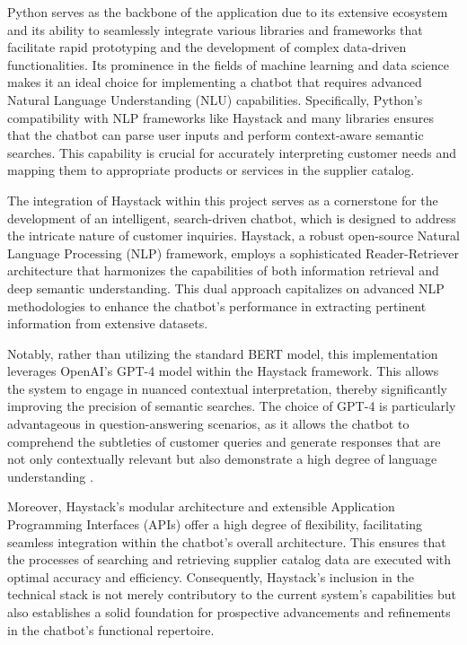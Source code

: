 
Python serves as the backbone of the application due to its extensive ecosystem and its ability to seamlessly integrate
various libraries and frameworks that facilitate rapid prototyping and the development of complex data-driven
functionalities.\autocite[cf.][p. 12]{shrivastavaDesignImplementationChatbot}
\autocite[cf.][pp. 240-241]{christensenPythonPipelineRapid2022} Its prominence in the fields of machine
learning and data science makes it an ideal choice for implementing a chatbot that requires advanced Natural Language
Understanding (NLU) capabilities.\autocite[cf.][p. 1]{lortiePythonModernData2022}\autocite[cf.][p. 85]{joshiOverviewPythonLibraries}
Specifically, Python's compatibility with NLP frameworks like Haystack and many libraries ensures that
the chatbot can parse user inputs and perform context-aware semantic searches.\autocite[cf.][p. 21]{fareezPOPULARPYTHONLIBRARIES2020}
This capability is crucial for accurately interpreting customer needs and mapping them to appropriate products or services in the supplier catalog.

The integration of Haystack within this project serves as a cornerstone for the development of an intelligent,
search-driven chatbot, which is designed to address the intricate nature of customer inquiries. Haystack, a robust
open-source Natural Language Processing (NLP) framework, employs a sophisticated Reader-Retriever architecture that
harmonizes the capabilities of both information retrieval and deep semantic understanding. This dual approach
capitalizes on advanced NLP methodologies to enhance the chatbot’s performance in extracting pertinent information from
extensive datasets\autocite[cf.][p. 236]{krishnamoorthyEvolutionReadingComprehension2021}.

Notably, rather than utilizing the standard BERT model, this implementation leverages OpenAI’s GPT-4 model within the
Haystack framework. This allows the system to engage in nuanced contextual interpretation, thereby significantly
improving the precision of semantic searches. The choice of GPT-4 is particularly advantageous in question-answering
scenarios, as it allows the chatbot to comprehend the subtleties of customer queries and generate responses that are not
only contextually relevant but also demonstrate a high degree of language understanding
\autocite[cf.][pp. 943-944]{syedQuestionAnsweringChatbot2021}.

Moreover, Haystack’s modular architecture and extensible Application Programming Interfaces (APIs) offer a high degree
of flexibility, facilitating seamless integration within the chatbot’s overall architecture. This ensures that the
processes of searching and retrieving supplier catalog data are executed with optimal accuracy and efficiency.
Consequently, Haystack’s inclusion in the technical stack is not merely contributory to the current system’s
capabilities but also establishes a solid foundation for prospective advancements and refinements in the chatbot’s
functional repertoire.

